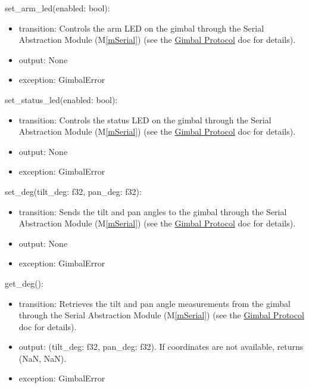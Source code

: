 \documentclass[12pt, titlepage]{article}
\newcommand{\mref}[1]{M\ref{#1}}
\begin{document}
\noindent set\_arm\_led(enabled: bool):
\begin{itemize}
  \item transition: Controls the arm LED on the gimbal through the Serial Abstraction
        Module (\mref{mSerial}) (see the
        \href{https://github.com/SpaceY-Labs/RoCam/blob/main/docs/Design/GimbalProtocol/GimbalProtocol.pdf}{Gimbal
          Protocol} doc for details).
  \item output: None
  \item exception: GimbalError
\end{itemize}

\noindent set\_status\_led(enabled: bool):
\begin{itemize}
  \item transition: Controls the status LED on the gimbal through the Serial
        Abstraction Module (\mref{mSerial}) (see the
        \href{https://github.com/SpaceY-Labs/RoCam/blob/main/docs/Design/GimbalProtocol/GimbalProtocol.pdf}{Gimbal
          Protocol} doc for details).
  \item output: None
  \item exception: GimbalError
\end{itemize}

\noindent set\_deg(tilt\_deg: f32, pan\_deg: f32):
\begin{itemize}
  \item transition: Sends the tilt and pan angles to the gimbal through the Serial
        Abstraction Module (\mref{mSerial}) (see the
        \href{https://github.com/SpaceY-Labs/RoCam/blob/main/docs/Design/GimbalProtocol/GimbalProtocol.pdf}{Gimbal
          Protocol} doc for details).
  \item output: None
  \item exception: GimbalError
\end{itemize}

\noindent get\_deg():
\begin{itemize}
  \item transition: Retrieves the tilt and pan angle measurements from the gimbal
        through the Serial Abstraction Module (\mref{mSerial}) (see the
        \href{https://github.com/SpaceY-Labs/RoCam/blob/main/docs/Design/GimbalProtocol/GimbalProtocol.pdf}{Gimbal
          Protocol} doc for details).
  \item output: (tilt\_deg: f32, pan\_deg: f32). If coordinates are not available,
        returns (NaN, NaN).
  \item exception: GimbalError
\end{itemize}
\end{document}

